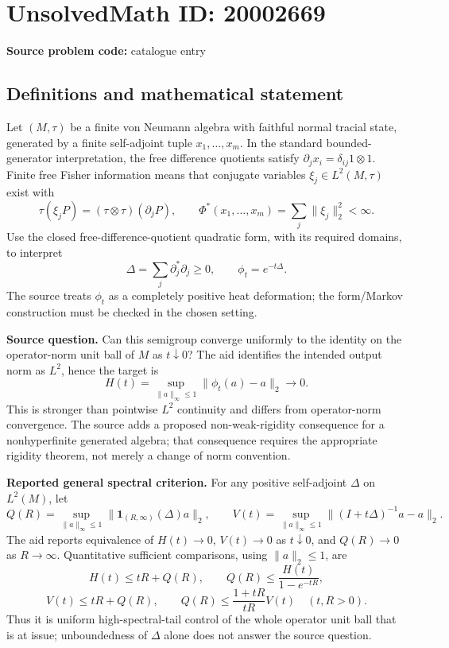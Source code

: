 \documentclass[11pt]{article}
\begin{document}
\section*{UnsolvedMath ID: 20002669}
\textbf{Source problem code:} catalogue entry
\subsection{Definitions and mathematical statement}
Let \((M,\tau)\) be a finite von Neumann algebra with faithful normal tracial state, generated by a finite self-adjoint tuple \(x_1,\ldots,x_m\). In the standard bounded-generator interpretation, the free difference quotients satisfy \(\partial_jx_i=\delta_{ij}1\otimes1\). Finite free Fisher information means that conjugate variables \(\xi_j\in L^2(M,\tau)\) exist with
\[
 \tau(\xi_jP)=(\tau\otimes\tau)(\partial_jP),\qquad
 \Phi^*(x_1,\ldots,x_m)=\sum_j\|\xi_j\|_2^2<\infty.
\]
Use the closed free-difference-quotient quadratic form, with its required domains, to interpret
\[
 \Delta=\sum_j\partial_j^*\partial_j\geq0,
 \qquad\phi_t=e^{-t\Delta}.
\]
The source treats \(\phi_t\) as a completely positive heat deformation; the form/Markov construction must be checked in the chosen setting.

\textbf{Source question.} Can this semigroup converge uniformly to the identity on the operator-norm unit ball of \(M\) as \(t\downarrow0\)? The aid identifies the intended output norm as \(L^2\), hence the target is
\[
 H(t)=\sup_{\|a\|_\infty\leq1}\|\phi_t(a)-a\|_2\longrightarrow0.
\]
This is stronger than pointwise \(L^2\) continuity and differs from operator-norm convergence. The source adds a proposed non-weak-rigidity consequence for a nonhyperfinite generated algebra; that consequence requires the appropriate rigidity theorem, not merely a change of norm convention.

\textbf{Reported general spectral criterion.} For any positive self-adjoint \(\Delta\) on \(L^2(M)\), let
\[
 Q(R)=\sup_{\|a\|_\infty\leq1}
       \|\mathbf1_{(R,\infty)}(\Delta)a\|_2,
\qquad
 V(t)=\sup_{\|a\|_\infty\leq1}
       \|(I+t\Delta)^{-1}a-a\|_2.
\]
The aid reports equivalence of \(H(t)\to0\), \(V(t)\to0\) as \(t\downarrow0\), and \(Q(R)\to0\) as \(R\to\infty\). Quantitative sufficient comparisons, using \(\|a\|_2\leq1\), are
\[
 H(t)\leq tR+Q(R),\qquad
 Q(R)\leq\frac{H(t)}{1-e^{-tR}},
\]
\[
 V(t)\leq tR+Q(R),\qquad
 Q(R)\leq\frac{1+tR}{tR}V(t)
 \quad(t,R>0).
\]
Thus it is uniform high-spectral-tail control of the whole operator unit ball that is at issue; unboundedness of \(\Delta\) alone does not answer the source question.
\end{document}
